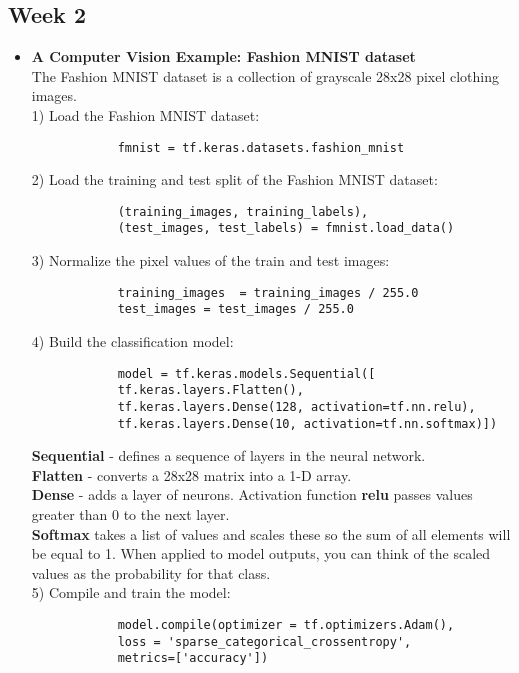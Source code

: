 \documentclass[20pt]{article}
\begin{document}
	\subsection{Week 2}
	\begin{itemize}
		\item \textbf{A Computer Vision Example: Fashion MNIST dataset}
		\\
		The Fashion MNIST dataset is a collection of grayscale 28x28 pixel clothing images.
		\\
		1) Load the Fashion MNIST dataset:
		\begin{verbatim}
			fmnist = tf.keras.datasets.fashion_mnist
		\end{verbatim}
		2) Load the training and test split of the Fashion MNIST dataset:
		\begin{verbatim}
			(training_images, training_labels), 
			(test_images, test_labels) = fmnist.load_data()
		\end{verbatim}
		3) Normalize the pixel values of the train and test images:
		\begin{verbatim}
			training_images  = training_images / 255.0
			test_images = test_images / 255.0
		\end{verbatim}
		4) Build the classification model:
		\begin{verbatim}
			model = tf.keras.models.Sequential([
			tf.keras.layers.Flatten(), 
			tf.keras.layers.Dense(128, activation=tf.nn.relu), 
			tf.keras.layers.Dense(10, activation=tf.nn.softmax)])
		\end{verbatim}
		\textbf{Sequential} - defines a sequence of layers in the neural network.\\ \textbf{Flatten} - converts a 28x28 matrix into a 1-D array.\\ \textbf{Dense} - adds a layer of neurons.  
		Activation function \textbf{relu} passes values greater than 0 to the next layer.\\ \textbf{Softmax} takes a list of values and scales these so the sum of all elements will be equal to 1. When applied to model outputs, you can think of the scaled values as the probability for that class.
		\\
		5) Compile and train the model:
		\begin{verbatim}
			model.compile(optimizer = tf.optimizers.Adam(),
			loss = 'sparse_categorical_crossentropy',
			metrics=['accuracy'])
			

\end{verbatim}
\end{itemize}
\end{document}
